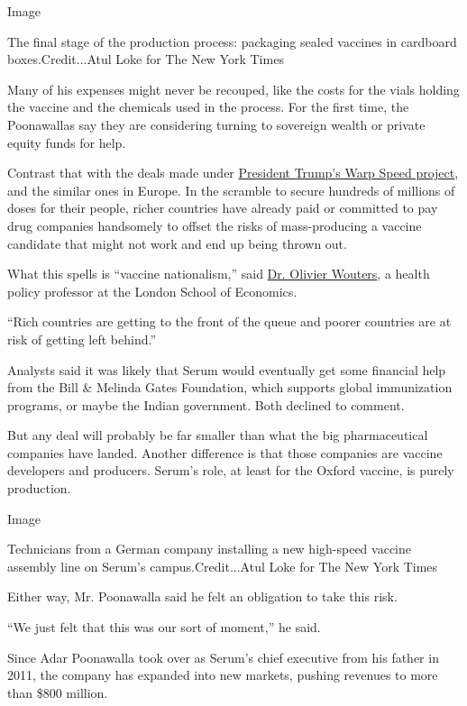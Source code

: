 Image

The final stage of the production process: packaging sealed vaccines in
cardboard boxes.Credit...Atul Loke for The New York Times

Many of his expenses might never be recouped, like the costs for the
vials holding the vaccine and the chemicals used in the process. For the
first time, the Poonawallas say they are considering turning to
sovereign wealth or private equity funds for help.

Contrast that with the deals made under
\href{https://www.nytimes.com/2020/06/03/us/politics/coronavirus-vaccine-trump-moderna.html}{President
Trump's Warp Speed project}, and the similar ones in Europe. In the
scramble to secure hundreds of millions of doses for their people,
richer countries have already paid or committed to pay drug companies
handsomely to offset the risks of mass-producing a vaccine candidate
that might not work and end up being thrown out.

What this spells is ``vaccine nationalism,'' said
\href{http://www.lse.ac.uk/health-policy/people/dr-olivier-wouters}{Dr.
Olivier Wouters}, a health policy professor at the London School of
Economics.

``Rich countries are getting to the front of the queue and poorer
countries are at risk of getting left behind.''

Analysts said it was likely that Serum would eventually get some
financial help from the Bill \& Melinda Gates Foundation, which supports
global immunization programs, or maybe the Indian government. Both
declined to comment.

But any deal will probably be far smaller than what the big
pharmaceutical companies have landed. Another difference is that those
companies are vaccine developers and producers. Serum's role, at least
for the Oxford vaccine, is purely production.

Image

Technicians from a German company installing a new high-speed vaccine
assembly line on Serum's campus.Credit...Atul Loke for The New York
Times

Either way, Mr. Poonawalla said he felt an obligation to take this risk.

``We just felt that this was our sort of moment,'' he said.

Since Adar Poonawalla took over as Serum's chief executive from his
father in 2011, the company has expanded into new markets, pushing
revenues to more than \$800 million.

